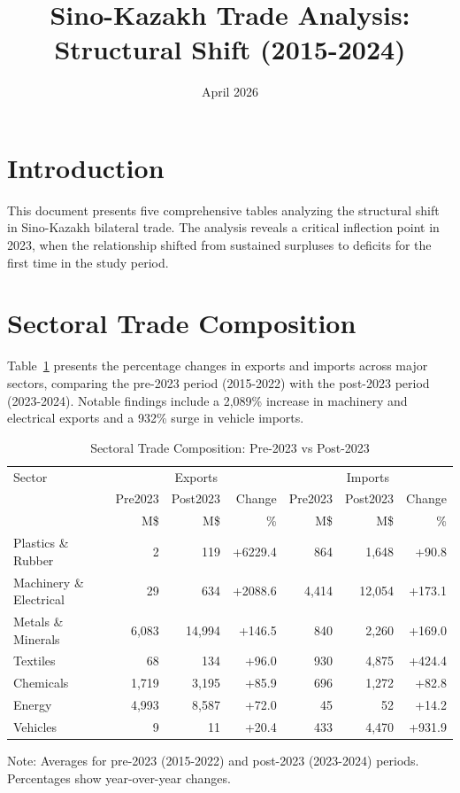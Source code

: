 \documentclass[12pt]{article}
\title{Sino-Kazakh Trade Analysis: Structural Shift (2015-2024)}
\author{}
\date{April 2026}
\begin{document}
\maketitle

\section{Introduction}

This document presents five comprehensive tables analyzing the structural shift in Sino-Kazakh bilateral trade. The analysis reveals a critical inflection point in 2023, when the relationship shifted from sustained surpluses to deficits for the first time in the study period.

\section{Sectoral Trade Composition}

Table~\ref{tab:sectoral_composition} presents the percentage changes in exports and imports across major sectors, comparing the pre-2023 period (2015-2022) with the post-2023 period (2023-2024). Notable findings include a 2,089\% increase in machinery and electrical exports and a 932\% surge in vehicle imports.

\begin{table}[H]
\centering
\small
\caption{Sectoral Trade Composition: Pre-2023 vs Post-2023}
\label{tab:sectoral_composition}
\begin{tabular}{lrrrrrr}
\toprule
Sector & \multicolumn{3}{c}{Exports} & \multicolumn{3}{c}{Imports} \\
 & Pre2023 & Post2023 & Change & Pre2023 & Post2023 & Change \\
 & M\$ & M\$ & \% & M\$ & M\$ & \% \\
\midrule
Plastics \& Rubber & 2 & 119 & +6229.4 & 864 & 1,648 & +90.8 \\
Machinery \& Electrical & 29 & 634 & +2088.6 & 4,414 & 12,054 & +173.1 \\
Metals \& Minerals & 6,083 & 14,994 & +146.5 & 840 & 2,260 & +169.0 \\
Textiles & 68 & 134 & +96.0 & 930 & 4,875 & +424.4 \\
Chemicals & 1,719 & 3,195 & +85.9 & 696 & 1,272 & +82.8 \\
Energy & 4,993 & 8,587 & +72.0 & 45 & 52 & +14.2 \\
Vehicles & 9 & 11 & +20.4 & 433 & 4,470 & +931.9 \\
\bottomrule
\end{tabular}
\footnotesize
Note: Averages for pre-2023 (2015-2022) and post-2023 (2023-2024) periods. Percentages show year-over-year changes.
\end{table}
\end{document}
